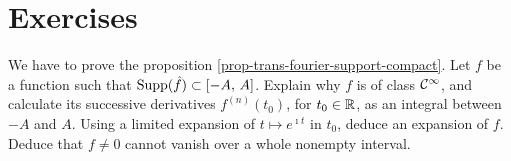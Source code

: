 \section{Exercises}
\label{sect1-chap3-exercises} 
 
 
 
\begin{exo}
\label{exo-transforme-sup-comp}
 
 We have to prove the proposition \ref{prop-trans-fourier-support-compact}. Let $ f $ be a function such that $ \operatorname{Supp} (\hat{f}) \subset [-A, \, A] $. Explain why $ f $ is of class $ \mathcal{C}^{\infty} $, and calculate its successive derivatives $ f^{(n)} (t_0) $, for $ t_0 \in \mathbb{R} $, as an integral between $ -A $ and $ A $. Using a limited expansion of $ t \mapsto e^{\imath t} $ in $ t_0 $, deduce an expansion of $ f $. Deduce that $ f \neq 0 $ cannot vanish over a whole nonempty interval.
\end{exo}
 
